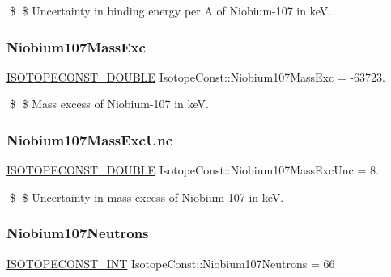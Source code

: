 \$ \$ Uncertainty in binding energy per A of Niobium-\/107 in keV. \mbox{\label{group___isotope_const-_niobium-_nb107_gad1c742352f93ac4ea384b391f4835d8e}} 
\subsubsection{\texorpdfstring{Niobium107\+Mass\+Exc}{Niobium107MassExc}}
{\footnotesize\ttfamily \mbox{\hyperlink{group___isotope_const-_macros_ga8f45a7272ce02c0b4c65c44636ed719a}{I\+S\+O\+T\+O\+P\+E\+C\+O\+N\+S\+T\+\_\+\+D\+O\+U\+B\+LE}} Isotope\+Const\+::\+Niobium107\+Mass\+Exc = -\/63723.}

\$ \$ Mass excess of Niobium-\/107 in keV. \mbox{\label{group___isotope_const-_niobium-_nb107_ga6f194e1585a6865c6d355c75cf6cc35b}} 
\subsubsection{\texorpdfstring{Niobium107\+Mass\+Exc\+Unc}{Niobium107MassExcUnc}}
{\footnotesize\ttfamily \mbox{\hyperlink{group___isotope_const-_macros_ga8f45a7272ce02c0b4c65c44636ed719a}{I\+S\+O\+T\+O\+P\+E\+C\+O\+N\+S\+T\+\_\+\+D\+O\+U\+B\+LE}} Isotope\+Const\+::\+Niobium107\+Mass\+Exc\+Unc = 8.}

\$ \$ Uncertainty in mass excess of Niobium-\/107 in keV. \mbox{\label{group___isotope_const-_niobium-_nb107_ga90eb6f874adda5c0788d9974a0b38021}} 
\subsubsection{\texorpdfstring{Niobium107\+Neutrons}{Niobium107Neutrons}}
{\footnotesize\ttfamily \mbox{\hyperlink{group___isotope_const-_macros_ga5f18360b3e99483a35c32d789e62621c}{I\+S\+O\+T\+O\+P\+E\+C\+O\+N\+S\+T\+\_\+\+I\+NT}} Isotope\+Const\+::\+Niobium107\+Neutrons = 66}

